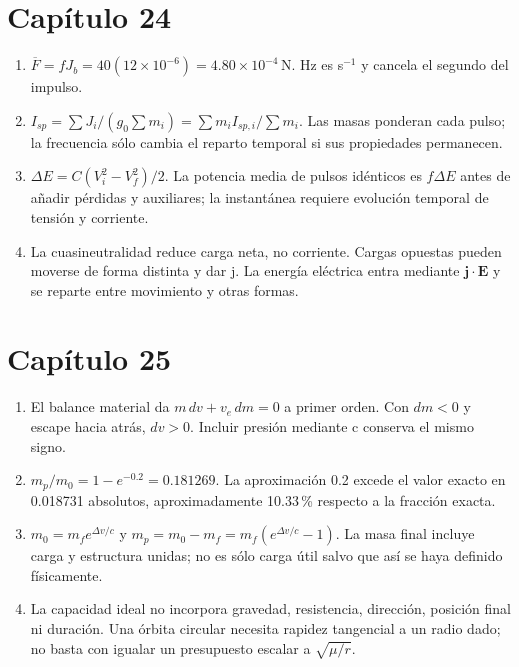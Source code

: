 \section*{Capítulo 24}
\begin{enumerate}
\item $\overline F=fJ_b=40(12\times10^{-6})=4.80\times10^{-4}\,\mathrm N$. Hz es s$^{-1}$ y cancela el segundo del impulso.
\item $I_{sp}=\sum J_i/(g_0\sum m_i)=\sum m_iI_{sp,i}/\sum m_i$. Las masas ponderan cada pulso; la frecuencia sólo cambia el reparto temporal si sus propiedades permanecen.
\item $\Delta E=C(V_i^2-V_f^2)/2$. La potencia media de pulsos idénticos es $f\Delta E$ antes de añadir pérdidas y auxiliares; la instantánea requiere evolución temporal de tensión y corriente.
\item La cuasineutralidad reduce carga neta, no corriente. Cargas opuestas pueden moverse de forma distinta y dar j. La energía eléctrica entra mediante $\mathbf j\cdot\mathbf E$ y se reparte entre movimiento y otras formas.
\end{enumerate}
\section*{Capítulo 25}
\begin{enumerate}
\item El balance material da $m\,dv+v_e\,dm=0$ a primer orden. Con $dm<0$ y escape hacia atrás, $dv>0$. Incluir presión mediante c conserva el mismo signo.
\item $m_p/m_0=1-e^{-0.2}=0.181269$. La aproximación 0.2 excede el valor exacto en 0.018731 absolutos, aproximadamente 10.33\,\% respecto a la fracción exacta.
\item $m_0=m_fe^{\Delta v/c}$ y $m_p=m_0-m_f=m_f(e^{\Delta v/c}-1)$. La masa final incluye carga y estructura unidas; no es sólo carga útil salvo que así se haya definido físicamente.
\item La capacidad ideal no incorpora gravedad, resistencia, dirección, posición final ni duración. Una órbita circular necesita rapidez tangencial a un radio dado; no basta con igualar un presupuesto escalar a $\sqrt{\mu/r}$.
\end{enumerate}
